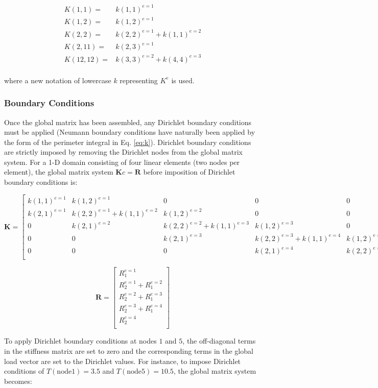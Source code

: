 \documentclass[10pt]{article}
\newcommand{\beq}{\begin{equation}}
\newcommand{\eeq}{\end{equation}}
\newcommand{\beqa}{\begin{equation}\begin{aligned}}
\newcommand{\eeqa}{\end{aligned}\end{equation}}
\begin{document}
\beqa
K(1, 1) =& k(1, 1)^{e=1}\\
K(1, 2) =& k(1, 2)^{e=1}\\
K(2, 2) =& k(2, 2)^{e=1}+k(1, 1)^{e=2}\\
K(2, 11) =& k(2, 3)^{e=1}\\
K(12, 12) =& k(3, 3)^{e=2}+k(4, 4)^{e=3}\\
\eeqa

where a new notation of lowercase \(k\) representing \(K^e\) is used.

\subsubsection{Boundary Conditions}
Once the global matrix has been assembled, any Dirichlet boundary conditions must be applied (Neumann boundary conditions have naturally been applied by the form of the perimeter integral in Eq. \eqref{eq:k}). Dirichlet boundary conditions are strictly imposed by removing the Dirichlet nodes from the global matrix system. For a 1-D domain consisting of four linear elements (two nodes per element), the global matrix system \(\textbf{K}c=\textbf{R}\) before imposition of Dirichlet boundary conditions is:

\beq
\textbf{K}=
\begin{bmatrix}
k(1, 1)^{e=1} & k(1, 2)^{e=1} & 0 & 0 & 0\\
k(2, 1)^{e=1} & k(2, 2)^{e=1}+k(1, 1)^{e=2} & k(1, 2)^{e=2} & 0 & 0\\
0 & k(2, 1)^{e=2} & k(2, 2)^{e=2}+k(1, 1)^{e=3} & k(1, 2)^{e=3} & 0\\
0 & 0 & k(2, 1)^{e=3} & k(2, 2)^{e=3}+k(1, 1)^{e=4} & k(1, 2)^{e=4}\\
0 & 0 & 0 & k(2, 1)^{e=4} & k(2, 2)^{e=4}\\
\end{bmatrix}
\eeq

\beq
\textbf{R}=\begin{bmatrix}
R_1^{e=1} \\ R_2^{e=1}+R_1^{e=2}\\R_2^{e=2}+R_1^{e=3}\\R_2^{e=3}+R_1^{e=4}\\R_2^{e=4}\\
\end{bmatrix}
\eeq

To apply Dirichlet boundary conditions at nodes \(1\) and \(5\), the off-diagonal terms in the stiffness matrix are set to zero and the corresponding terms in the global load vector are set to the Dirichlet values. For instance, to impose Dirichlet conditions of \(T(\textrm{node} 1)=3.5\) and \(T(\textrm{node} 5) = 10.5\), the global matrix system becomes:
\end{document}
